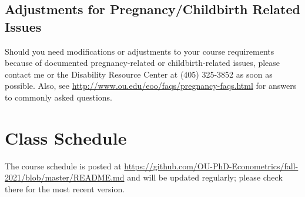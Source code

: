 \documentclass[11pt,english]{article}
\begin{document}
\subsection*{Adjustments for Pregnancy/Childbirth Related Issues}

Should you need modifications or adjustments to your course requirements because of documented pregnancy-related or childbirth-related issues, please contact me or the Disability Resource Center at (405) 325-3852 as soon as possible. Also, see \url{http://www.ou.edu/eoo/faqs/pregnancy-faqs.html} for answers to commonly asked questions.

\section*{Class Schedule}
The course schedule is posted at \url{https://github.com/OU-PhD-Econometrics/fall-2021/blob/master/README.md} and will be updated regularly; please check there for the most recent version.
\end{document}
